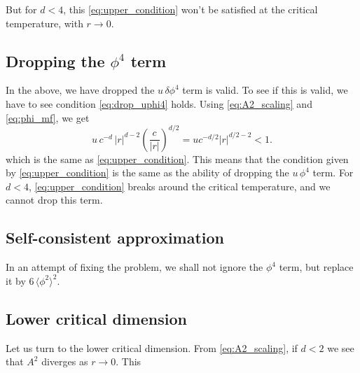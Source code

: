 \documentclass{article}
\begin{document}
But for $d < 4$, this \eqref{eq:upper_condition}
won't be satisfied at the critical temperature, with $r \rightarrow 0$.



\subsection{Dropping the $\phi^4$ term}


In the above, we have dropped the $u \, \delta\phi^4$ term is valid.
To see if this is valid,
we have to see condition \eqref{eq:drop_uphi4} holds.
Using \eqref{eq:A2_scaling} and \eqref{eq:phi_mf}, we get
$$
u \, c^{-d} \, |r|^{d - 2}
\left( \frac{c}{|r|} \right)^{d/2}
=
u c^{-d/2} |r|^{d/2 - 2}
< 1.
$$
which is the same as \eqref{eq:upper_condition}.
%
This means that the condition given by \eqref{eq:upper_condition}
is the same as the ability of dropping the $u \, \phi^4$ term.
%
For $d < 4$, \eqref{eq:upper_condition} breaks around the critical temperature,
and we cannot drop this term.


\subsection{Self-consistent approximation}

In an attempt of fixing the problem,
we shall not ignore the $\phi^4$ term,
but replace it by $6 \, \langle \phi^2 \rangle^2$.


\subsection{Lower critical dimension}


Let us turn to the lower critical dimension.
From \eqref{eq:A2_scaling},
if $d < 2$ we see that $A^2$ diverges as $r\rightarrow 0$.
This
\end{document}
